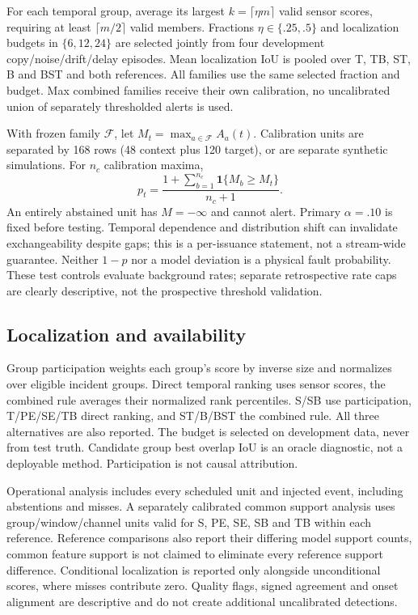 \documentclass[conference]{IEEEtran}
\begin{document}
For each temporal group, average its largest $k=\lceil\eta m\rceil$ valid sensor
scores, requiring at least $\lceil m/2\rceil$ valid members. Fractions
$\eta\in\{.25,.5\}$ and localization budgets in $\{6,12,24\}$ are selected
jointly from four development copy/noise/drift/delay episodes. Mean localization
IoU is pooled over T, TB, ST, B and BST and both references. All families use
the same selected fraction and budget. Max combined families receive their
own calibration, no uncalibrated union of separately thresholded alerts is used.

With frozen family $\mathcal F$, let $M_t=\max_{a\in\mathcal F}A_a(t)$.
Calibration units are separated by 168 rows (48 context plus 120 target), or
are separate synthetic simulations. For $n_c$ calibration maxima,
\begin{equation}
p_t=\frac{1+\sum_{b=1}^{n_c}\mathbf1\{M_b\geq M_t\}}{n_c+1}.
\label{eq:rank}
\end{equation}
An entirely abstained unit has $M=-\infty$ and cannot alert. Primary
$\alpha=.10$ is fixed before testing. Temporal dependence and distribution
shift can invalidate exchangeability despite gaps; this is a per-issuance
statement, not a stream-wide guarantee. Neither $1-p$ nor a model deviation
is a physical fault probability. These test controls evaluate background rates;
separate retrospective rate caps are clearly descriptive, not the prospective
threshold validation.









\subsection{Localization and availability}
Group participation weights each group's score by inverse size and normalizes
over eligible incident groups. Direct temporal ranking uses sensor scores,
the combined rule averages their normalized rank percentiles. S/SB use
participation, T/PE/SE/TB direct ranking, and ST/B/BST the combined rule.
All three alternatives are also reported. The budget is selected on development
data, never from test truth. Candidate group best overlap IoU is an oracle
diagnostic, not a deployable method. Participation is not causal attribution.

Operational analysis includes every scheduled unit and injected event, including
abstentions and misses. A separately calibrated common support analysis uses
group/window/channel units valid for S, PE, SE, SB and TB within each reference.
Reference comparisons also report their differing model support counts, common
feature support is not claimed to eliminate every reference support difference.
Conditional localization is reported only alongside unconditional scores, where
misses contribute zero. Quality flags, signed agreement and onset alignment
are descriptive and do not create additional uncalibrated detections.
\end{document}
